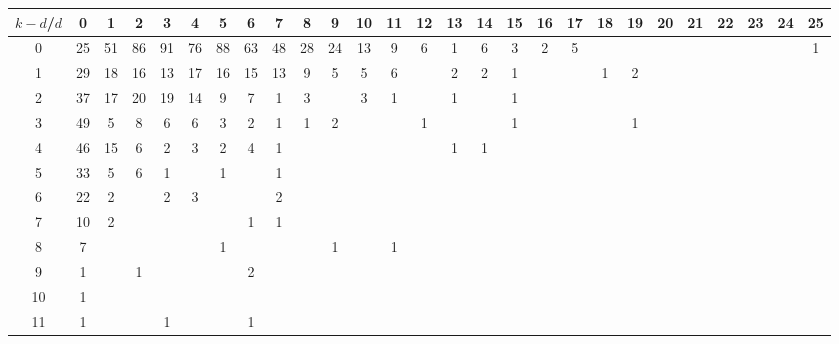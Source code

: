 \begin{landscape}

\begin{table}[h]\footnotesize
{\centering
\begin{tabular}{|c|c|
c|c|c|c|c|c|c|c|c|c|c|c|c|c|c|c|c|c|c|c|c|c|c|c|c|}
  \hline
  $k-d$/$d$
 & 0 & 1 & 2 & 3 & 4 & 5 & 6 & 7 & 8 & 9 & 10 & 11 & 12 & 13 & 14 & 15 & 16 & 17 & 18 & 19 & 20 & 21 & 22 & 23 & 24 & 25\\

  \hline
  \hline

0  & 25 & 51 & 86 & 91 & 76 & 88 & 63 & 48 & 28 & 24 & 13 & 9 & 6 & 1 & 6 & 3 & 2 & 5 &  &  &  &  &  &  &  & 1\\

1  & 29 & 18 & 16 & 13 & 17 & 16 & 15 & 13 & 9 & 5 & 5 & 6 &  & 2 & 2 & 1 &  &  & 1 & 2 &  &  &  &  &  & \\

2  & 37 & 17 & 20 & 19 & 14 & 9 & 7 & 1 & 3 &  & 3 & 1 &  & 1 &  & 1 &  &  &  &  &  &  &  &  &  & \\

3  & 49 & 5 & 8 & 6 & 6 & 3 & 2 & 1 & 1 & 2 &  &  & 1 &  &  & 1 &  &  &  & 1 &  &  &  &  &  & \\

4  & 46 & 15 & 6 & 2 & 3 & 2 & 4 & 1 &  &  &  &  &  & 1 & 1 &  &  &  &  &  &  &  &  &  &  & \\

5  & 33 & 5 & 6 & 1 &  & 1 &  & 1 &  &  &  &  &  &  &  &  &  &  &  &  &  &  &  &  &  & \\

6  & 22 & 2 &  & 2 & 3 &  &  & 2 &  &  &  &  &  &  &  &  &  &  &  &  &  &  &  &  &  & \\

7  & 10 & 2 &  &  &  &  & 1 & 1 &  &  &  &  &  &  &  &  &  &  &  &  &  &  &  &  &  & \\

8  & 7 &  &  &  &  & 1 &  &  &  & 1 &  & 1 &  &  &  &  &  &  &  &  &  &  &  &  &  & \\

9  & 1 &  & 1 &  &  &  & 2 &  &  &  &  &  &  &  &  &  &  &  &  &  &  &  &  &  &  & \\

10  & 1 &  &  &  &  &  &  &  &  &  &  &  &  &  &  &  &  &  &  &  &  &  &  &  &  & \\

11  & 1 &  &  & 1 &  &  & 1 &  &  &  &  &  &  &  &  &  &  &  &  &  &  &  &  &  &  & \\


\end{tabular}}
\end{table}
\end{landscape}
